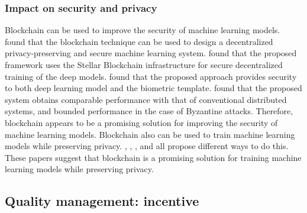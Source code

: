 \documentclass{article}
\begin{document}
\subsubsection{Impact on security and privacy}
Blockchain can be used to improve the security of machine learning models. \cite{chen_2020} found that the blockchain technique can be used to design a decentralized privacy-preserving and secure machine learning system. \cite{fadaeddini_2019} found that the proposed framework uses the Stellar Blockchain infrastructure for secure decentralized training of the deep models. \cite{goel_2019} found that the proposed approach provides security to both deep learning model and the biometric template. \cite{wang_ai_2020} found that the proposed system obtains comparable performance with that of conventional distributed systems, and bounded performance in the case of Byzantine attacks. Therefore, blockchain appears to be a promising solution for improving the security of machine learning models.\newline
Blockchain also can be used to train machine learning models while preserving privacy. \cite{ladia_2019}, \cite{kim_2019}, \cite{chen_2018}, and \cite{weng_2019} all propose different ways to do this. These papers suggest that blockchain is a promising solution for training machine learning models while preserving privacy.

\subsection{Quality management: incentive}
\end{document}
